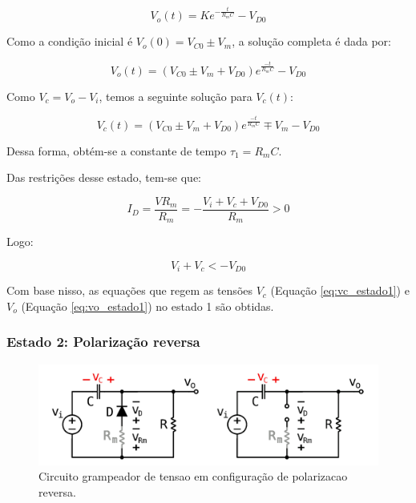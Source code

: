 \begin{equation}
    \tag*{Solucao completa}
    V_o(t) = K e^{-\frac{t}{R_m C}} - V_{D0}
\end{equation}

Como a condição inicial é $V_o(0) = V_{C0} \pm V_m$, a solução completa é dada por:

\begin{equation}
    \label{eq:vo_estado1}
    V_o(t) = (V_{C0} \pm V_m + V_{D0}) e^\frac{-t}{R_m C} - V_{D0}
\end{equation}

Como $V_c = V_o - V_i$, temos a seguinte solução para $V_c(t)$:

\begin{equation}
    \label{eq:vc_estado1}
    V_c(t) = (V_{C0} \pm V_m + V_{D0}) e^\frac{-t}{R_m C} \mp V_m - V_{D0}
\end{equation}

Dessa forma, obtém-se a constante de tempo $\tau_1 = R_m C$.

Das restrições desse estado, tem-se que:

\begin{equation}
    I_D = \frac{V R_m}{R_m} = - \frac{V_i + V_c + V_{D0}}{R_m} > 0
\end{equation}

Logo:

\begin{equation}
    V_i + V_c < - V_{D0}
\end{equation}

Com base nisso, as equações que regem as tensões $V_c$ (Equação \ref{eq:vc_estado1}) e $V_o$ (Equação \ref{eq:vo_estado1}) no estado 1 são obtidas.


\subsubsection{Estado 2: Polarização reversa}


\begin{figure}[H]
    \centering
    \includegraphics[width=1\columnwidth]{images/o_circuito_reverso.png}
    \caption{Circuito grampeador de tensao em configuração de polarizacao reversa.}
\end{figure}

